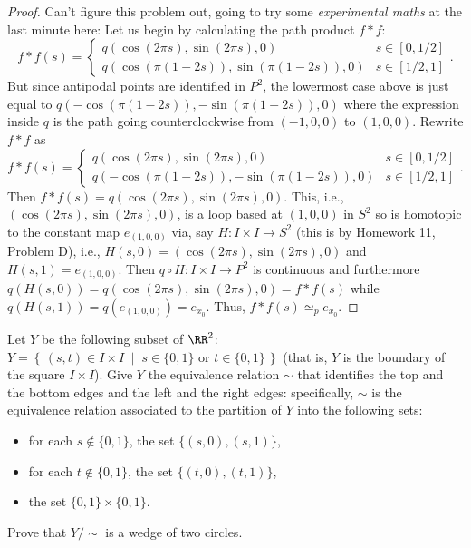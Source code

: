 \begin{proof}

Can't figure this problem out, going to try some \emph{experimental maths}
at the last minute here: Let us begin by calculating the path product
$f*f$:
\[
f*f(s)=\begin{cases}
q(\cos(2\pi s),\sin(2\pi s),0)&s\in[0,1/2]\\
q(\cos(\pi(1-2s)),\sin(\pi(1-2s)),0)&s\in[1/2,1]
\end{cases}.
\]
But since antipodal points are identified in $P^2$, the lowermost case
above is just equal to $q(-\cos(\pi(1-2s)),-\sin(\pi(1-2s)),0)$ where the
expression inside $q$ is the path going counterclockwise from $(-1,0,0)$ to
$(1,0,0)$. Rewrite $f*f$ as
\[
f*f(s)=\begin{cases}
q(\cos(2\pi s),\sin(2\pi s),0)&s\in[0,1/2]\\
q(-\cos(\pi(1-2s)),-\sin(\pi(1-2s)),0)&s\in[1/2,1]
\end{cases}.
\]
Then $f*f(s)=q(\cos(2\pi s),\sin(2\pi s),0)$. This, i.e., $(\cos(2\pi
s),\sin(2\pi s),0)$, is a loop based at $(1,0,0)$ in $S^2$ so is homotopic
to the constant map $e_{(1,0,0)}$ via, say $H\colon I\times I\to S^2$ (this
is by Homework 11, Problem D), i.e., $H(s,0)=(\cos(2\pi s),\sin(2\pi s),0)$
and $H(s,1)=e_{(1,0,0)}$. Then $q\circ H\colon I\times I\to P^2$ is
continuous and furthermore $q(H(s,0))=q(\cos(2\pi s),\sin(2\pi
s),0)=f*f(s)$ while $q(H(s,1))=q(e_{(1,0,0)})=e_{x_0}$. Thus,
$f*f(s)\simeq_p e_{x_0}$.
\end{proof}
\newpage
\begin{problem}[C]
Let $Y$ be the following subset of $\RR^2$: $Y=\left\{\,(s,t)\in
  I\times I\;\middle|\;\text{$s\in\{0,1\}$ or
    $t\in\{0,1\}$}\,\right\}$ (that is, $Y$ is the boundary of
the square $I\times I$). Give $Y$ the equivalence relation $\sim$
that identifies the top and the bottom edges and the left and the
right edges: specifically, $\sim$ is the equivalence relation
associated to the partition of $Y$ into the following sets:
\begin{itemize}
\item for each $s\notin\{0,1\}$, the set $\{(s,0),(s,1)\}$,
\item for each $t\notin\{0,1\}$, the set $\{(t,0),(t,1)\}$,
\item the set $\{0,1\}\times\{0,1\}$.
\end{itemize}
Prove that $Y/{\sim}$ is a wedge of two circles.
\end{problem}
